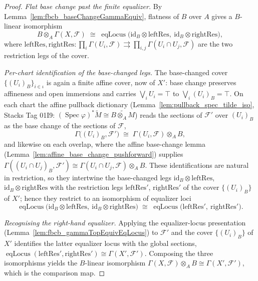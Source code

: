 \begin{theorem}
\begin{proof}
    \emph{Flat base change past the finite equalizer.} By
    Lemma~\ref{lem:fbcb_baseChangeGammaEquiv}, flatness of \(B\) over \(A\) gives a \(B\)-linear
    isomorphism
    \[
      B \otimes_A \Gamma(X,\mathcal{F}) \;\cong\;
        \operatorname{eqLocus}\bigl(\mathrm{id}_B\otimes\mathrm{leftRes},\ \mathrm{id}_B\otimes\mathrm{rightRes}\bigr),
    \]
    where \(\mathrm{leftRes}, \mathrm{rightRes} : \prod_i \Gamma(U_i,\mathcal{F}) \rightrightarrows
    \prod_{i,j}\Gamma(U_i\cap U_j,\mathcal{F})\) are the two restriction legs of the cover.

    \emph{Per-chart identification of the base-changed legs.} The base-changed cover
    \(\{(U_i)_B\}_{i\in\iota}\) is again a finite affine cover, now of \(X'\): base change preserves
    affineness and open immersions and carries \(\bigvee_i U_i = \top\) to \(\bigvee_i (U_i)_B = \top\).
    On each chart the affine pullback dictionary (Lemma~\ref{lem:pullback_spec_tilde_iso}, Stacks
    Tag 01I9: \((\operatorname{Spec}\varphi)^*\widetilde M \cong \widetilde{B\otimes_A M}\)) reads the
    sections of \(\mathcal{F}'\) over \((U_i)_B\) as the base change of the sections of \(\mathcal{F}\),
    \[
      \Gamma\bigl((U_i)_B, \mathcal{F}'\bigr) \;\cong\; \Gamma(U_i,\mathcal{F}) \otimes_A B,
    \]
    and likewise on each overlap, where the affine base-change lemma
    (Lemma~\ref{lem:affine_base_change_pushforward}) supplies
    \(\Gamma((U_i\cap U_j)_B, \mathcal{F}') \cong \Gamma(U_i\cap U_j,\mathcal{F})\otimes_A B\). These
    identifications are natural in restriction, so they intertwine the base-changed legs
    \(\mathrm{id}_B\otimes\mathrm{leftRes}\), \(\mathrm{id}_B\otimes\mathrm{rightRes}\) with the
    restriction legs \(\mathrm{leftRes}'\), \(\mathrm{rightRes}'\) of the cover \(\{(U_i)_B\}\) of
    \(X'\); hence they restrict to an isomorphism of equalizer loci
    \[
      \operatorname{eqLocus}\bigl(\mathrm{id}_B\otimes\mathrm{leftRes},\ \mathrm{id}_B\otimes\mathrm{rightRes}\bigr)
      \;\cong\;
      \operatorname{eqLocus}\bigl(\mathrm{leftRes}',\ \mathrm{rightRes}'\bigr).
    \]

    \emph{Recognising the right-hand equalizer.} Applying the equalizer-locus presentation
    (Lemma~\ref{lem:fbcb_gammaTopEquivEqLocus}) to \(\mathcal{F}'\) and the cover \(\{(U_i)_B\}\) of
    \(X'\) identifies the latter equalizer locus with the global sections,
    \(\operatorname{eqLocus}(\mathrm{leftRes}',\mathrm{rightRes}') \cong \Gamma(X',\mathcal{F}')\).
    Composing the three isomorphisms yields the \(B\)-linear isomorphism
    \(\Gamma(X,\mathcal{F})\otimes_A B \cong \Gamma(X',\mathcal{F}')\), which is the comparison map.


\end{proof}
\end{theorem}
